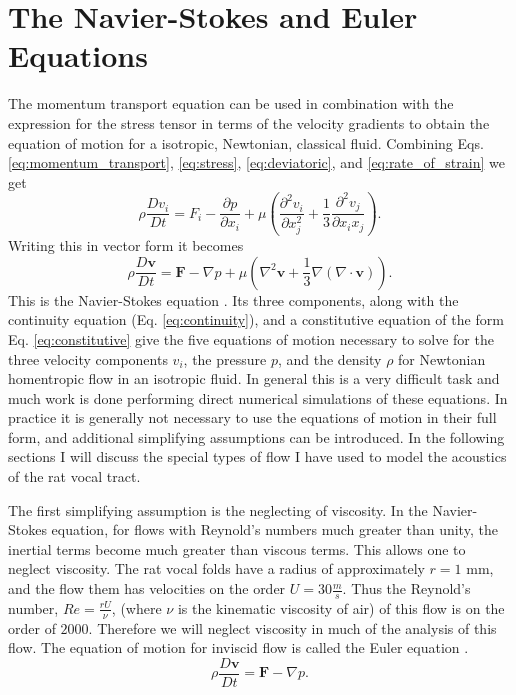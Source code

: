 \documentclass[12pt, letter]{report}
\begin{document}
\section{The Navier-Stokes and Euler Equations}
The momentum transport equation can be used in combination with the expression for the stress tensor in terms of the velocity gradients to obtain the equation of motion for a isotropic, Newtonian, classical fluid. Combining Eqs. \ref{eq:momentum_transport}, \ref{eq:stress}, \ref{eq:deviatoric}, and \ref{eq:rate_of_strain} we get
\begin{equation}   
\rho \frac{D v_i}{D t} = F_i - \frac{\partial p}{\partial x_i} + \mu \left( \frac{\partial^2 v_i}{\partial x_j^2} + \frac{1}{3} \frac{\partial^2 v_j}{\partial x_i x_j}\right).
\end{equation}
Writing this in vector form it becomes
\begin{equation}
\label{eq:navier} 
\rho \frac{D \textbf{v}}{D t} = \textbf{F} - \nabla p + \mu \left( \nabla^2 \textbf{v} + \frac{1}{3} \nabla (\nabla \cdot \textbf{v})\right).
\end{equation}
This is the Navier-Stokes equation \cite{Batchelor2000}. Its three components, along with the continuity equation (Eq. \ref{eq:continuity}), and a constitutive equation of the form Eq. \ref{eq:constitutive} give the five equations of motion necessary to solve for the three velocity components $v_i$, the pressure $p$, and the density $\rho$ for Newtonian homentropic flow in an isotropic fluid. In general this is a very difficult task and much work is done performing direct numerical simulations of these equations. In practice it is generally not necessary to use the equations of motion in their full form, and additional simplifying assumptions can be introduced. In the following sections I will discuss the special types of flow I have used to model the acoustics of the rat vocal tract.

The first simplifying assumption is the neglecting of viscosity. In the Navier-Stokes equation, for flows with Reynold's numbers much greater than unity, the inertial terms become much greater than viscous terms. This allows one to neglect viscosity. The rat vocal folds have a radius of approximately $r=1$ mm, and the flow them has velocities on the order $U=30 \frac{m}{s}$. Thus the Reynold's number, $Re=\frac{r U}{\nu}$, (where $\nu$ is the kinematic viscosity of air) of this flow is on the order of $2000$. Therefore we will neglect viscosity in much of the analysis of this flow. The equation of motion for inviscid flow is called the Euler equation \cite{Batchelor2000}.
\begin{equation}
\label{eq:euler} 
\rho \frac{D \textbf{v}}{D t} = \textbf{F} - \nabla p.
\end{equation} 
\end{document}
